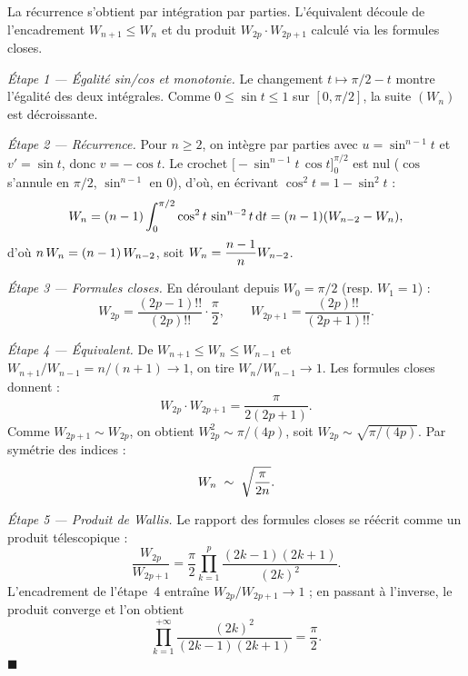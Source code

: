 \decsep{}


\begin{ideepreuve}
La récurrence s'obtient par intégration par parties. L'équivalent découle
de l'encadrement $W_{n+1} \leq W_n$ et du produit $W_{2p}\cdot W_{2p+1}$
calculé via les formules closes.
\end{ideepreuve}

\vspace{10pt}

\begin{mdframed}[style=proofbar]
  \textit{Étape 1 — Égalité sin/cos et monotonie.}
  Le changement $t \mapsto \pi/2-t$ montre l'égalité des deux intégrales.
  Comme $0\leq\sin t\leq 1$ sur $[0,\pi/2]$, la suite $(W_n)$ est décroissante.

  \medskip
  \textit{Étape 2 — Récurrence.}
  Pour $n\geq 2$, on intègre par parties avec $u = \sin^{n-1}t$ et
  $v' = \sin t$, donc $v = -\cos t$. Le crochet
  $\bigl[-\sin^{n-1}t\,\cos t\bigr]_0^{\pi/2}$ est nul ($\cos$ s'annule en
  $\pi/2$, $\sin^{n-1}$ en $0$), d'où, en écrivant $\cos^2 t = 1-\sin^2 t$ :
  \[
    W_n = (n-1)\int_0^{\pi/2}\cos^2 t\,\sin^{n-2}t\,\mathrm{d}t
         = (n-1)(W_{n-2}-W_n),
  \]
  d'où $n\,W_n = (n-1)\,W_{n-2}$, soit $W_n = \dfrac{n-1}{n}W_{n-2}$.

  \medskip
  \textit{Étape 3 — Formules closes.}
  En déroulant depuis $W_0 = \pi/2$ (resp. $W_1 = 1$) :
  \[
    W_{2p} = \frac{(2p-1)!!}{(2p)!!}\cdot\frac{\pi}{2}, \qquad
    W_{2p+1} = \frac{(2p)!!}{(2p+1)!!}.
  \]

  \medskip
  \textit{Étape 4 — Équivalent.}
  De $W_{n+1}\leq W_n\leq W_{n-1}$ et $W_{n+1}/W_{n-1}=n/(n+1)\to 1$,
  on tire $W_n/W_{n-1}\to 1$. Les formules closes donnent :
  \[
    W_{2p}\cdot W_{2p+1} = \frac{\pi}{2(2p+1)}.
  \]
  Comme $W_{2p+1}\sim W_{2p}$, on obtient $W_{2p}^2\sim\pi/(4p)$, soit
  $W_{2p}\sim\sqrt{\pi/(4p)}$. Par symétrie des indices :
  \[
    W_n\;\sim\;\sqrt{\frac{\pi}{2n}}.
  \]

  \medskip
  \textit{Étape 5 — Produit de Wallis.}
  Le rapport des formules closes se réécrit comme un produit télescopique :
  \[
    \frac{W_{2p}}{W_{2p+1}}
    = \frac{\pi}{2}\prod_{k=1}^{p}\frac{(2k-1)(2k+1)}{(2k)^2}.
  \]
  L'encadrement de l'étape~4 entraîne $W_{2p}/W_{2p+1}\to 1$ ; en passant à
  l'inverse, le produit converge et l'on obtient
  \[
    \prod_{k=1}^{+\infty}\frac{{(2k)}^2}{(2k-1)(2k+1)}=\frac{\pi}{2}.
  \]
  \hfill$\blacksquare$
\end{mdframed}

